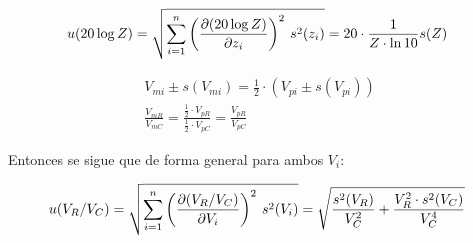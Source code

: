 \documentclass[11pt]{report}
\begin{document}
\begin{refsection}
\begin{center}
\begin{equation}
\begin{split}
    u(20 \log Z)=\sqrt{\sum^n_{i=1} \left( \frac{\partial (20 \log Z)}{\partial z_i} \right)^2\hspace{2 pt} s^2(z_i)}=
    20 \cdot \frac{1}{Z \cdot \ln 10}s(Z)
    \hspace{4pt}
    \label{eq:logzerr}
\end{split}
\end{equation}

\begin{equation}
\begin{split}
    V_{mi} \pm s(V_{mi}) = \frac{1}{2}\cdot \left(V_{pi} \pm s(V_{pi})\right) \\
    \frac{V_{mR}}{V_{mC}} = \frac{\frac{1}{2}\cdot V_{pR}}{\frac{1}{2}\cdot V_{pC}} = \frac{V_{pR}}{V_{pC}}
    \label{eq:aclaraciones}
\end{split}
\end{equation}
\end{center}
\bigskip

Entonces se sigue que de forma general para ambos $V_i$:

\begin{center}
\begin{equation}
\begin{split}
    u(V_R/V_C)=\sqrt{\sum^n_{i=1} \left( \frac{\partial (V_R/V_C)}{\partial V_i} \right)^2\hspace{2 pt} s^2(V_i)}=
    \sqrt{\frac{s^2(V_R)}{V_C^2}+\frac{V_R^2\cdot s^2(V_C)}{V_C^4}}
    \hspace{4pt}
    \label{eq:VR/VC}
\end{split}
\end{equation}
\end{center}


\end{refsection}
\end{document}
